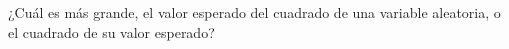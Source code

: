 \begin{statement}{15}
  ¿Cu\'al es m\'as grande, el valor esperado del cuadrado de una variable aleatoria,
  o el cuadrado de su valor esperado?
\end{statement}